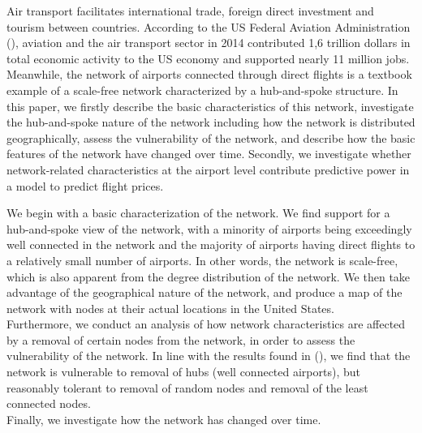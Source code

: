 \label{sec:intro}




Air transport facilitates international trade, foreign direct investment and tourism between countries. According to the US Federal Aviation Administration (\citet{FAA}), aviation and the air transport sector in 2014 contributed 1,6 trillion dollars in total economic activity to the US economy and supported nearly 11 million jobs. Meanwhile, the network of airports connected through direct flights is a textbook example of a scale-free network characterized by a hub-and-spoke structure. In this paper, we firstly describe the basic characteristics of this network, investigate the hub-and-spoke nature of the network including how the network is distributed geographically, assess the vulnerability of the network, and describe how the basic features of the network have changed over time. Secondly, we investigate whether network-related characteristics at the airport level contribute predictive power in a model to predict flight prices. 

\medskip 

We begin with a basic characterization of the network. We find support for a hub-and-spoke view of the network, with a minority of airports being exceedingly well connected in the network and the majority of airports having direct flights to a relatively small number of airports. In other words, the network is scale-free, which is also apparent from the degree distribution of the network. We then take advantage of the geographical nature of the network, and produce a map of the network with nodes at their actual locations in the United States. \\ Furthermore, we conduct an analysis of how network characteristics are affected by a removal of certain nodes from the network, in order to assess the vulnerability of the network. In line with the results found in (\cite{chi2004structural}), we find that the network is vulnerable to removal of hubs (well connected airports), but reasonably tolerant to removal of random nodes and removal of the least connected nodes. \\ Finally, we investigate how the network has changed over time. 

